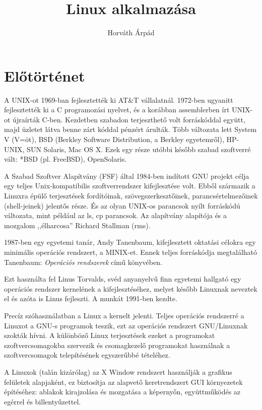 \documentclass[a4paper]{article}
\begin{document}
\title{Linux alkalmazása}
\author{Horváth Árpád}
\maketitle

\section{Előtörténet}

A UNIX-ot 1969-ban fejlesztették ki  AT\&T vállalatnál. 1972-ben
ugyanitt fejlesztették ki a C programozási nyelvet, és a korábban
assemblerben írt UNIX-ot újraírták C-ben. Kezdetben szabadon
terjeszthető volt forráskóddal együtt, majd üzletet látva benne
zárt kóddal pénzért árulták. Több változata lett System V (V=öt), BSD
(Berkley Software Distribution, a Berkley egyetemről), HP-UNIX, SUN
Solaris, Mac OS X. Ezek egy része utóbbi később szabad szoftverré vált:
*BSD (pl. FreeBSD), OpenSolaris.

A  Szabad Szoftver Alapítvány (FSF) által 1984-ben indított GNU projekt
célja egy teljes Unix-kompatibilis szoftverrendszer kifejlesztése volt.
Ebből származik a Linuxra épülő terjesztések fordítóinak,
szövegszerkesztőinek, parancsértelmezőinek (shell-jeinek) jelentős
része.  És az olyan UNIX-os parancsok nyílt forráskódú változata, mint
például az  ls, cp parancsok.
Az alapítvány alapítója és a mozgalom ,,élharcosa'' Richard Stallman (rms).

1987-ben egy egyetemi tanár, Andy Tanenbaum, kifejlesztett oktatási
célokra egy minimális operációs rendszert, a MINIX-et. Ennek teljes
forráskódja megtalálható Tanenbaum: \textit{Operációs rendszerek} című
könyvében.

Ezt használta fel Linus Torvalds, svéd anyanyelvű finn egyetemi hallgató
egy operációs rendszer kernelének a kifejlesztéséhez, melyet később
Linuxnak neveztek el és azóta is Linus fejleszti. A munkát 1991-ben
kezdte.

Precíz szóhasználatban a Linux a kernelt jelenti. Teljes operációs
rendszerré a Linuxot a GNU-s programok teszik, ezt az operációs
rendszert GNU/Linuxnak szokták hívni. A különböző Linux terjesztések
ezeket a programokat szoftvercsomagokba szervezik és csomagkezelő
programokat használnak a szoftvercsomagok telepítésének egyszerűbbé
tételéhez.

A Linuxok (talán kizárólag) az X Window rendszert használják a grafikus
felületek alapjaként, ez biztosítja az alapvető keretrendszert GUI
környezetek építéséhez: ablakok kirajzolása és mozgatása a képernyőn,
együttműködés az egérrel és billentyűzettel. 
\end{document}

